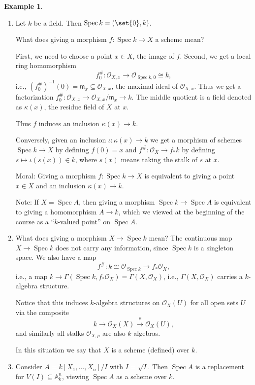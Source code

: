 \documentclass[a4paper]{amsbook}
\theoremstyle{definition}
\newtheorem*{example*}{Example}
\DeclareMathOperator\Spec{Spec}
\begin{document}
\begin{example*}
\label{ExamplesOfSchemes}
\begin{enumerate}
	\item Let $k$ be a field. Then $\Spec k = (\set{0}, k)$.

		What does giving a morphism $f\colon \Spec k\to X$ a scheme mean?

		First, we need to choose a point $x \in X$, the image of $f$. Second,
		we get a local ring homomorphism
		\[ f^\#_0\colon \mathcal{O}_{X, x} \to \mathcal{O}_{\Spec k, 0} \cong k, \]
		i.e., $(f_0^\#)^{-1}(0) = \mathfrak{m}_x \subseteq \mathcal{O}_{X, x}$, the maximal
		ideal of $\mathcal{O}_{X, x}$. Thus we get a factorization
		$f^\#_0\colon \mathcal{O}_{X, x}\to \mathcal{O}_{X, x}/\mathfrak{m}_x \to k$.
		The middle quotient is a field denoted as $\kappa(x)$, the residue field
		of $X$ at $x$.

		Thus $f$ induces an inclusion $\kappa(x) \to k$.

		Conversely, given an inclusion $\iota\colon\kappa(x)\to k$ we get a morphism of
		schemes $\Spec k\to X$ by defining $f(0) = x$ and
		$f^\#\colon \mathcal{O}_X\to f_*k$ by defining $s\mapsto \iota(s(x)) \in k$,
		where $s(x)$ means taking the stalk of $s$ at $x$.

		Moral: Giving a morphism $f\colon \Spec k\to X$ is equivalent to giving
		a point $x \in X$ and an inclusion $\kappa(x)\to k$.

		Note: If $X = \Spec A$, then giving a morphism $\Spec k \to \Spec A$ is
		equivalent to giving a homomorphism $A\to k$, which we viewed at the
		beginning of the course as a \enquote{$k$-valued point} on $\Spec A$.
	\item What does giving a morphism $X\to \Spec k$ mean? The continuous map
		$X \to \Spec k$ does not carry any information, since $\Spec k$ is
		a singleton space. We also have a map
		\[ f^\#\colon k \cong \mathcal{O}_{\Spec k}\to f_*\mathcal{O}_X, \]
		i.e., a map $k\to \Gamma(\Spec k, f_*\mathcal{O}_X) = \Gamma(X, \mathcal{O}_X)$,
		i.e., $\Gamma(X, \mathcal{O}_X)$ carries a $k$-algebra structure.

		Notice that this induces $k$-algebra structures on $\mathcal{O}_X(U)$
		for all open sets $U$ via the composite
		\[ k \longrightarrow \mathcal{O}_X(X) \stackrel{\rho}\longrightarrow \mathcal{O}_X(U), \]
		and similarly all stalks $\mathcal{O}_{X, p}$ are also $k$-algebras.

		In this situation we say that $X$ is a scheme (defined) over $k$.
	\item Consider $A = k[X_1, \ldots, X_n]/I$ with $I = \sqrt{I}$. Then
		$\Spec A$ is a replacement for $V(I) \subseteq \mathbb{A}^n_k$, viewing
		$\Spec A$ as a scheme over $k$.


\end{enumerate}
\end{example*}
\end{document}
